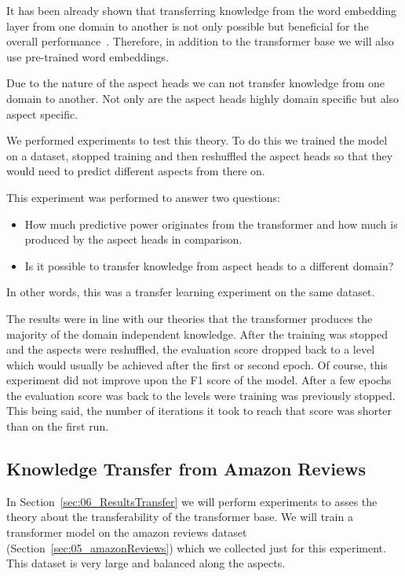 It has been already shown that transferring knowledge from the word embedding layer from one domain to another is not only possible but beneficial for the overall performance~\cite{Yosinski2014}. Therefore, in addition to the transformer base we will also use pre-trained word embeddings.
\medskip

Due to the nature of the aspect heads we can not transfer knowledge from one domain to another. Not only are the aspect heads highly domain specific but also aspect specific. 
\smallskip

We performed experiments to test this theory. To do this we trained the model on a dataset, stopped training and then reshuffled the aspect heads so that they would need to predict different aspects from there on. 

This experiment was performed to answer two questions: 

\begin{itemize}
	\item How much predictive power originates from the transformer and how much is produced by the aspect heads in comparison.
	\item Is it possible to transfer knowledge from aspect heads to a different domain?
\end{itemize}

In other words, this was a transfer learning experiment on the same dataset.

The results were in line with our theories that the transformer produces the majority of the domain independent knowledge. After the training was stopped and the aspects were reshuffled, the evaluation score dropped back to a level which would usually be achieved after the first or second epoch. Of course, this experiment did not improve upon the F1 score of the model. After a few epochs the evaluation score was back to the levels were training was previously stopped. This being said, the number of iterations it took to reach that score was shorter than on the first run.
\medskip

\subsection{Knowledge Transfer from Amazon Reviews}

In Section~\ref{sec:06_ResultsTransfer} we will perform experiments to asses the theory about the transferability of the transformer base. We will train a transformer model on the amazon reviews dataset {(Section~\ref{sec:05_amazonReviews})} which we collected just for this experiment. This dataset is very large and balanced along the aspects.
\medskip

